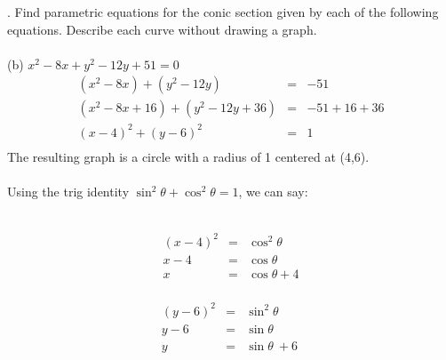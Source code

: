 \documentclass[11pt]{exam}
\begin{document}
. Find parametric equations for the conic section given by each of the following equations. Describe each curve without drawing a graph. \\
\\
\indent (b) $x^2-8x+y^2-12y+51=0$\\
\begin{eqnarray*}
(x^2-8x)+(y^2-12y)&=&-51\\
(x^2-8x+16)+(y^2-12y+36)&=&-51+16+36\\
(x-4)^2+(y-6)^2&=&1\\
\end{eqnarray*}
The resulting graph is a circle with a radius of 1 centered at (4,6).\\
\\
Using the trig identity $\sin^2 \theta + \cos^2 \theta = 1$, we can say:\\
\\
\noindent\begin{minipage}{.5\linewidth}
\begin{eqnarray*}
  (x-4)^2&=&\cos^2 \theta\\
  x-4&=&\cos \theta\\
  x&=&\cos \theta +4\\
\end{eqnarray*}
\end{minipage}%
\begin{minipage}{.5\linewidth}
\begin{eqnarray*}
  (y-6)^2&=&\sin^2 \theta\\
  y-6&=&\sin \theta\\
  y&=&\sin \theta\ +6\
\end{eqnarray*}
\end{minipage}
\end{document}
